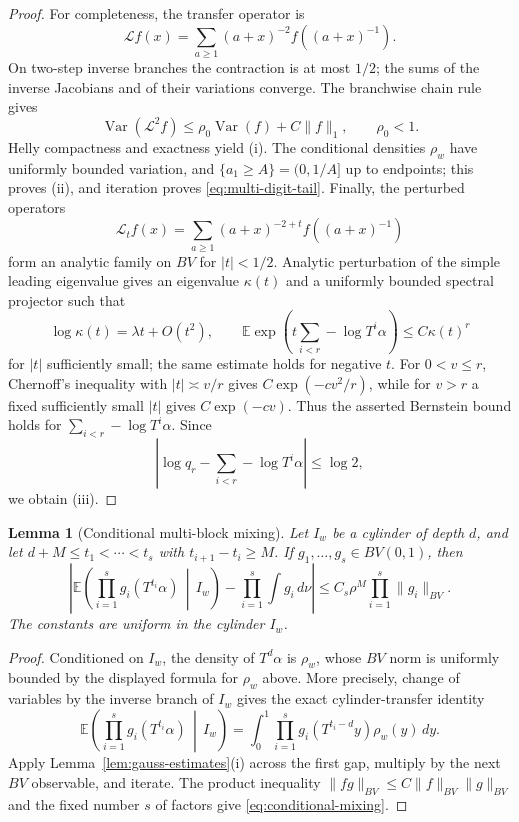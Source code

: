 \documentclass[11pt,a4paper]{amsart}
\newtheorem{lemma}[theorem]{Lemma}
\theoremstyle{definition}
\theoremstyle{remark}
\newcommand{\E}{\mathbb E}
\newcommand{\Var}{\operatorname{Var}}
\begin{document}
\begin{proof}
For completeness, the transfer operator is
\[
 \mathcal Lf(x)=\sum_{a\ge1}(a+x)^{-2}
 f\!\left((a+x)^{-1}\right).
\]
On two-step inverse branches the contraction is at most $1/2$; the sums of
the inverse Jacobians and of their variations converge.  The branchwise chain
rule gives
\[
 \Var(\mathcal L^2f)\le\rho_0\Var(f)+C\|f\|_1,
 \qquad \rho_0<1.
\]
Helly compactness and exactness yield (i).  The conditional densities
$\rho_w$ have uniformly bounded variation, and
$\{a_1\ge A\}=(0,1/A]$ up to endpoints; this proves (ii), and iteration proves
\eqref{eq:multi-digit-tail}.  Finally, the perturbed operators
\[
 \mathcal L_t f(x)=\sum_{a\ge1}(a+x)^{-2+t}
 f\!\left((a+x)^{-1}\right)
\]
form an analytic family on $BV$ for $|t|<1/2$.  Analytic perturbation of the
simple leading eigenvalue gives an eigenvalue $\kappa(t)$ and a uniformly
bounded spectral projector such that
\[
 \log\kappa(t)=\lambda t+O(t^2),
 \qquad
 \E\exp\!\left(t\sum_{i<r}-\log T^i\alpha\right)
 \le C\kappa(t)^r
\]
for $|t|$ sufficiently small; the same estimate holds for negative $t$.
For $0<v\le r$, Chernoff's inequality with $|t|\asymp v/r$ gives
$C\exp(-cv^2/r)$, while for $v>r$ a fixed sufficiently small $|t|$ gives
$C\exp(-cv)$.  Thus the asserted Bernstein bound holds for
$\sum_{i<r}-\log T^i\alpha$.
Since
\[
 \left|\log q_r-\sum_{i<r}-\log T^i\alpha\right|\le\log2,
\]
we obtain (iii).
\end{proof}

\begin{lemma}[Conditional multi-block mixing]\label{lem:conditional-mixing}
Let $I_w$ be a cylinder of depth $d$, and let
$d+M\le t_1<\cdots<t_s$ with $t_{i+1}-t_i\ge M$.  If
$g_1,\ldots,g_s\in BV(0,1)$, then
\begin{equation}\label{eq:conditional-mixing}
 \left|
 \E\left(\prod_{i=1}^s g_i(T^{t_i}\alpha)\,\middle|\,I_w\right)
 -\prod_{i=1}^s\int g_i\,d\nu
 \right|
 \le C_s\rho^M\prod_{i=1}^s\|g_i\|_{BV}.
\end{equation}
The constants are uniform in the cylinder $I_w$.
\end{lemma}

\begin{proof}
Conditioned on $I_w$, the density of $T^d\alpha$ is $\rho_w$, whose $BV$
norm is uniformly bounded by the displayed formula for $\rho_w$ above.  More
precisely, change of variables by the inverse branch of $I_w$ gives the exact
cylinder-transfer identity
\[
 \E\left(\prod_{i=1}^s g_i(T^{t_i}\alpha)\,\middle|\,I_w\right)
 =\int_0^1\prod_{i=1}^s g_i(T^{t_i-d}y)\rho_w(y)\,dy.
\]
Apply Lemma~\ref{lem:gauss-estimates}(i) across the first gap, multiply by the
next $BV$ observable, and iterate.  The product inequality
$\|fg\|_{BV}\le C\|f\|_{BV}\|g\|_{BV}$ and the fixed number $s$ of factors
give \eqref{eq:conditional-mixing}.
\end{proof}
\end{document}
